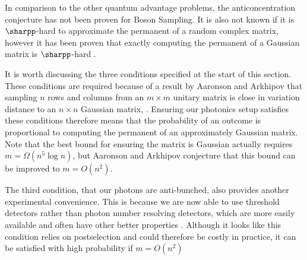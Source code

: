 In comparison to the other quantum advantage problems, the anticoncentration conjecture has not been proven for Boson Sampling. It is also not known if it is $\sharpp$-hard to approximate the permanent of a random complex matrix, however it has been proven that exactly computing the permanent of a Gaussian matrix is $\sharpp$-hard \cite{aaronson2010report, aaronson2011}.

It is worth discussing the three conditions specified at the start of this section. These conditions are required because of a result by Aaronson and Arkhipov that sampling $n$ rows and columns from an $m\times m$ unitary matrix is close in variation distance to an $n \times n$ Gaussian matrix, . Ensuring our photonics setup satisfies these conditions therefore means that the probability of an outcome is proportional to computing the permanent of an approximately Gaussian matrix. Note that the best bound for ensuring the matrix is Gaussian actually requires $m=\Omega(n^5\log n)$, but Aaronson and Arkhipov conjecture that this bound can be improved to $m=O(n^2)$.

The third condition, that our photons are anti-bunched, also provides another experimental convenience. This is because we are now able to use threshold detectors rather than photon number resolving detectors, which are more easily available and often have other better properties \cite{itzler2011, natarajan2012}. Although it looks like this condition relies on postselection and could therefore be costly in practice, it can be satisfied with high probability if $m=O(n^2)$ 


